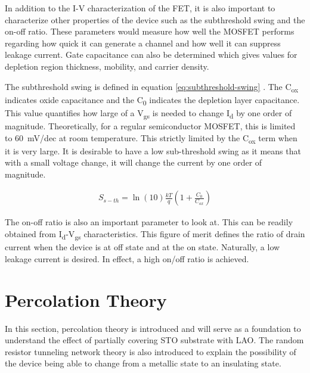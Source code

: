\documentclass[11pt,a4paper]{report}
\begin{document}
In addition to the I-V characterization of the FET, it is also important to characterize other properties of the device such as the subthreshold swing and the on-off ratio. These parameters would measure how well the MOSFET performs regarding how quick it can generate a channel and how well it can suppress leakage current. Gate capacitance can also be determined which gives values for depletion region thickness, mobility, and carrier density.

The subthreshold swing is defined in equation \ref{eq:subthreshold-swing} \cite{hu_2010}. The C\textsubscript{ox} indicates oxide capacitance and the C\textsubscript{0} indicates the depletion layer capacitance. This value quantifies how large of a V\textsubscript{gs} is needed to change I\textsubscript{d} by one order of magnitude. Theoretically, for a regular semiconductor MOSFET, this is limited to \SI{60}{\milli\volt}/dec at room temperature. This strictly limited by the C\textsubscript{ox} term when it is very large. It is desirable to have a low sub-threshold swing as it means that with a small voltage change, it will change the current by one order of magnitude.

\begin{align}
    S_{s-th} = \ln{(10)}\frac{kT}{q}\left(1+ \frac{C_0}{C_{ox}}\right)
    \label{eq:subthreshold-swing}
\end{align}

The on-off ratio is also an important parameter to look at. This can be readily obtained from I\textsubscript{d}-V\textsubscript{gs} characteristics.  This figure of merit defines the ratio of drain current when the device is at off state and at the on state. Naturally, a low leakage current is desired. In effect, a high on/off ratio is achieved.

\newpage

\section{Percolation Theory}
In this section, percolation theory is introduced and will serve as a foundation to understand the effect of partially covering STO substrate with LAO. The random resistor tunneling network theory is also introduced to explain the possibility of the device being able to change from a metallic state to an insulating state.
\end{document}
